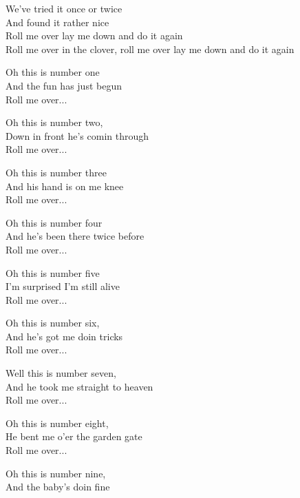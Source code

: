 \vspace{10pt}
We've tried it once or twice\\
And found it rather nice\\
Roll me over lay me down and do it again\\
Roll me over in the clover, roll me over lay me down and do it again\par
\vspace{10pt}
Oh this is number one \\
And the fun has just begun\\
Roll me over...\par
\vspace{10pt}
Oh this is number two,\\
Down in front he's comin through\\
Roll me over...\par
\vspace{10pt}
Oh this is number three\\
And his hand is on me knee\\
Roll me over...\par
\vspace{10pt}
Oh this is number four\\
And he's been there twice before\\
Roll me over...\par
\vspace{10pt}
Oh this is number five\\
I'm surprised I'm still alive\\
Roll me over...\par
\vspace{10pt}
Oh this is number six,\\
And he's got me doin tricks\\
Roll me over...\par
\vspace{10pt}
Well this is number seven,\\
And he took me straight to heaven\\
Roll me over...\par
\vspace{10pt}
Oh this is number eight,\\
He bent me o'er the garden gate\\
Roll me over...\par
\vspace{10pt}
Oh this is number nine,\\
And the baby's doin fine\\
